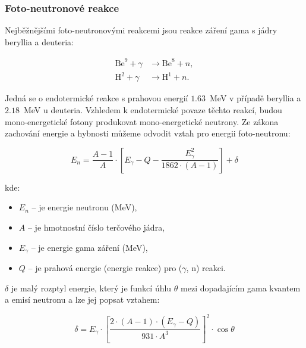 \subsubsection{Foto-neutronové reakce}

Nejběžnějšími foto-neutronovými reakcemi jsou reakce záření gama s jádry beryllia a deuteria:

\begin{align*}
    \text{Be}^9 + \gamma & \rightarrow \text{Be}^8 + n, \\
    \text{H}^2 + \gamma & \rightarrow \text{H}^1 + n.
\end{align*}

Jedná se o endotermické reakce s prahovou energií $1.63$~MeV v případě beryllia a $2.18$~MeV u deuteria. Vzhledem k endotermické povaze těchto reakcí, budou mono-energetické fotony produkovat mono-energetické neutrony. Ze zákona zachování energie a hybnosti můžeme odvodit vztah pro energii foto-neutronu:

\begin{equation}
E_n = \frac{A - 1}{A} \cdot \left[ E_\gamma - Q - \frac{E_\gamma^2}{1862 \cdot (A - 1)} \right] + \delta
\end{equation}

kde:

\begin{itemize}
    \item $E_n$ -- je energie neutronu (MeV),
    \item $A$ -- je hmotnostní číslo terčového jádra,
    \item $E_\gamma$ -- je energie gama záření (MeV),
    \item $Q$ -- je prahová energie (energie reakce) pro ($\gamma$, n) reakci.
\end{itemize}

$\delta$ je malý rozptyl energie, který je funkcí úhlu $\theta$ mezi dopadajícím gama kvantem a emisí neutronu a lze jej popsat vztahem:

\begin{equation}
\delta = E_\gamma \cdot \left[ \frac{2 \cdot (A - 1) \cdot (E_\gamma - Q)}{931 \cdot A^3} \right]^2 \cdot \cos \theta
\end{equation}

